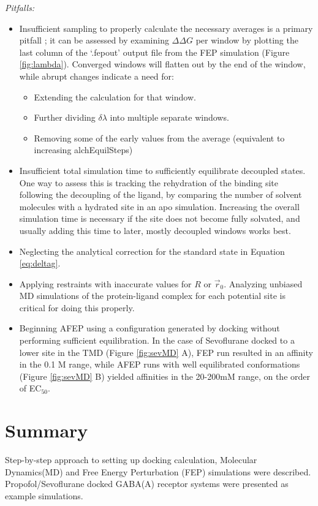 \documentclass[12pt]{article}
\begin{document}
\textit{Pitfalls:}
\begin{itemize}
	\item Insufficient sampling to properly calculate the necessary averages is a primary pitfall \cite{Pohorille2010}; it can be assessed by examining $\Delta\Delta G$ per window by plotting the last column of the `.fepout' output file from the FEP simulation (Figure \ref{fig:lambda}).  Converged windows will flatten out by the end of the window, while abrupt changes indicate a need for:
		\begin{itemize}
		\item Extending the calculation for that window. 
		\item Further dividing $\delta$$\lambda$ into multiple separate windows.  
		\item Removing some of the early values from the average (equivalent to increasing alchEquilSteps)
		\end{itemize}
	\item Insufficient total simulation time to sufficiently equilibrate decoupled states. One way to assess this is tracking the rehydration of the binding site following the decoupling of the ligand, by comparing the number of solvent molecules with a hydrated site in an apo simulation. Increasing the overall simulation time is necessary if the site does not become fully solvated, and usually adding this time to later, mostly decoupled windows works best.
	\item Neglecting the analytical correction for the standard state in Equation \ref{eq:deltag}.  
	\item Applying restraints with inaccurate values for $R$ or $\vec{r}_{0}$.  Analyzing unbiased MD simulations of the protein-ligand complex for each potential site is critical for doing this properly.  
	\item Beginning AFEP using a configuration generated by docking without performing sufficient equilibration. In the case of Sevoflurane docked to a lower site in the TMD (Figure \ref{fig:sevMD} A), FEP run resulted in an affinity in the 0.1 M range, while AFEP runs with well equilibrated conformations (Figure \ref{fig:sevMD} B) yielded affinities in the 20-200mM range, on the order of EC$_{50}$.  
	\end{itemize}

\section*{Summary}
Step-by-step approach to setting up docking calculation, Molecular Dynamics(MD) and Free Energy Perturbation (FEP) simulations were described. Propofol/Sevoflurane docked  GABA(A) receptor systems were presented as example simulations.
\end{document}
